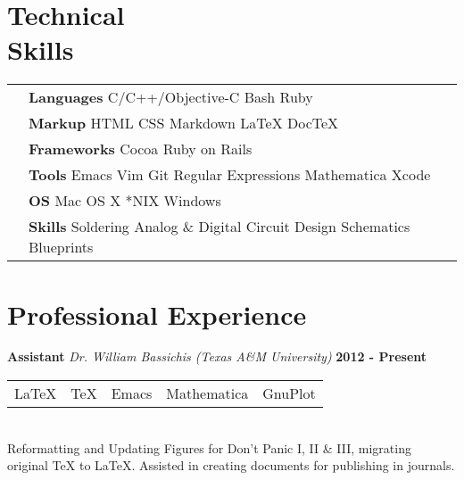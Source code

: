 {\begin{resume}
{  \section{\sc Technical \\ Skills}}
\hspace{-.35in}
{\renewcommand{\arraystretch}{1.25}
  \renewcommand{\tabcolsep}{0.175cm}
  \begin{tabular}{l l l}
    & {\bf Languages} C/C++/Objective-C Bash Ruby \\ %
    & {\bf Markup} HTML CSS Markdown \LaTeX{} Doc\TeX{}\\
    & {\bf Frameworks} Cocoa  Ruby on Rails \\
    & {\bf Tools} Emacs Vim  Git  Regular Expressions Mathematica Xcode \\
    & {\bf OS} Mac OS X *NIX Windows \\
    & {\bf Skills} Soldering  Analog \& Digital Circuit Design  Schematics Blueprints\\
  \end{tabular}}


\vspace*{.20in}
{\color{Black}
  \section{\sc Professional Experience}}
{\bf Assistant} {\em Dr. William Bassichis (Texas A{\&}M University)} \hfill {\bf 2012 - Present} \
\\
\begin{tabular}{l l l l l}
   \LaTeX{} &  \TeX{} &  Emacs &  Mathematica & GnuPlot
\end{tabular}
\\
Reformatting and Updating Figures for Don't Panic I, II \& III,
migrating \\ original \TeX{} to \LaTeX{}. Assisted in creating
documents for publishing in journals.
\vspace{-.13in}




\end{resume}}
